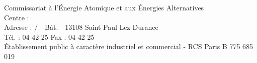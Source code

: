{\begin{center}
    \parbox[c][1cm][c]{\linewidth}{\centering\fontsize{16}{20}\selectfont\scshape\Proauteurs}

  \end{center}

  \vspace{42mm}

  \begin{flushleft}
    \fontsize{6}{7}\selectfont%
    Commissariat \`a l'\'Energie Atomique et aux \'Energies Alternatives\\
    Centre : \Procentrenom\\
    Adresse : \Prodepartement/\Proservice%
{} - B\^at. {\Probatimentservice} - 13108 Saint Paul Lez Durance\\
    T\'el. : 04 42 25 {\Protelephoneservice} \hspace{2.5mm} Fax : 04 42 25 {\Profaxservice} \\
    \'Etablissement public \`a caract\`ere industriel et commercial - RCS Paris B 775 685 019
  \end{flushleft}

  \newpage
}


